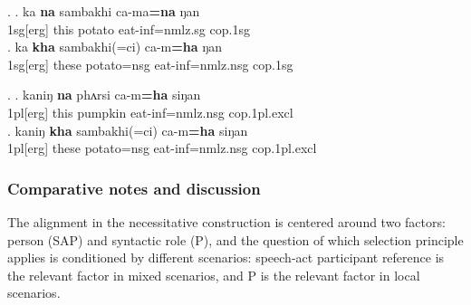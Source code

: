 \ex. \ag. ka {\bf na} sambakhi ca-ma{\bf =na} ŋan\\
{\sc 1sg[erg]} this potato eat-{\sc inf=nmlz.sg} {\sc cop.1sg}\\
\bg.  ka {\bf kha} sambakhi(=ci) ca-m{\bf =ha} ŋan \\
{\sc 1sg[erg]} these potato{\sc =nsg} eat-{\sc inf=nmlz.nsg} {\sc cop.1sg}\\

\ex. \ag. kaniŋ {\bf na} phʌrsi ca-m{\bf =ha} siŋan\\
{\sc 1pl[erg]} this pumpkin eat-{\sc inf=nmlz.nsg} {\sc cop.1pl.excl}\\
\bg.  kaniŋ {\bf kha} sambakhi(=ci) ca-m{\bf =ha} siŋan \\
{\sc 1pl[erg]} these potato{\sc =nsg} eat-{\sc inf=nmlz.nsg} {\sc cop.1pl.excl}\\

\subsubsection{Comparative notes and discussion}


The alignment in the necessitative construction is centered around two factors: person (SAP) and syntactic role (P), and the question of which selection principle applies is conditioned by different scenarios: speech-act participant reference is the relevant factor in mixed scenarios, and P is the relevant factor in local scenarios. 

